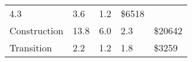 \begin{longtable}[c]{@{}lllll@{}}
\begin{minipage}[t]{0.17\columnwidth}
4.3
\strut\end{minipage} &
\begin{minipage}[t]{0.17\columnwidth}\raggedright\strut
3.6
\strut\end{minipage} &
\begin{minipage}[t]{0.17\columnwidth}\raggedright\strut
1.2
\strut\end{minipage} &
\begin{minipage}[t]{0.17\columnwidth}\raggedright\strut
\$6518
\strut\end{minipage}\tabularnewline
\begin{minipage}[t]{0.17\columnwidth}\raggedright\strut
Construction
\strut\end{minipage} &
\begin{minipage}[t]{0.17\columnwidth}\raggedright\strut
13.8
\strut\end{minipage} &
\begin{minipage}[t]{0.17\columnwidth}\raggedright\strut
6.0
\strut\end{minipage} &
\begin{minipage}[t]{0.17\columnwidth}\raggedright\strut
2.3
\strut\end{minipage} &
\begin{minipage}[t]{0.17\columnwidth}\raggedright\strut
\$20642
\strut\end{minipage}\tabularnewline
\begin{minipage}[t]{0.17\columnwidth}\raggedright\strut
Transition
\strut\end{minipage} &
\begin{minipage}[t]{0.17\columnwidth}\raggedright\strut
2.2
\strut\end{minipage} &
\begin{minipage}[t]{0.17\columnwidth}\raggedright\strut
1.2
\strut\end{minipage} &
\begin{minipage}[t]{0.17\columnwidth}\raggedright\strut
1.8
\strut\end{minipage} &
\begin{minipage}[t]{0.17\columnwidth}\raggedright\strut
\$3259
\strut\end{minipage}\tabularnewline
\bottomrule
\end{longtable}
